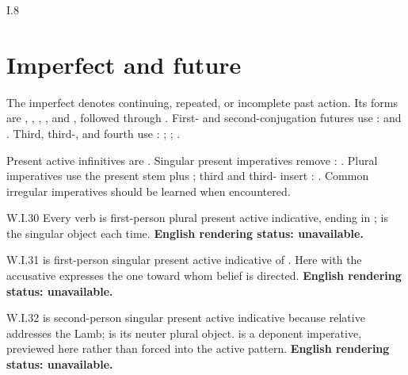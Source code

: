 \begin{courseunit}{I.8}
\section{Imperfect and future}

The imperfect denotes continuing, repeated, or incomplete past action. Its
forms are , , ,
, and , followed through
. First- and second-conjugation
futures use :
 and . Third, third-, and fourth use
:
; ;
.

Present active infinitives are . Singular present imperatives remove :
. Plural imperatives use the present stem
plus ; third and third- insert :
. Common irregular imperatives
should be learned when encountered.

\begin{workedexample}{}{W.I.30}
Every verb is first-person plural present active indicative, ending in
;  is the singular object each time.
\textbf{English rendering status: unavailable.}
\end{workedexample}

\begin{workedexample}{}{W.I.31}
 is first-person singular present active indicative of
. Here  with the accusative expresses the one
toward whom belief is directed. \textbf{English rendering status: unavailable.}
\end{workedexample}

\begin{workedexample}{}{W.I.32}
 is second-person singular present active indicative because
relative  addresses the Lamb;  is its neuter plural
object.  is a deponent imperative, previewed here rather than
forced into the active pattern. \textbf{English rendering status: unavailable.}
\end{workedexample}


\end{courseunit}
